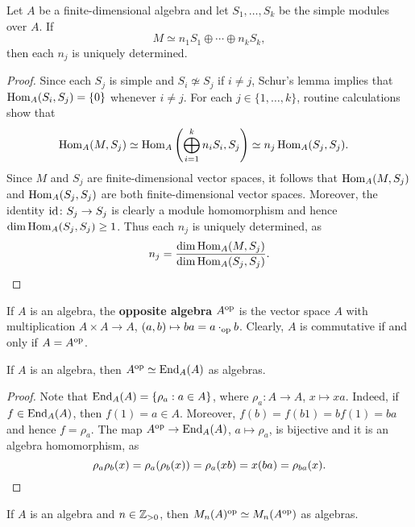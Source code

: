\begin{theorem}
Let $A$ be a finite-dimensional algebra and let 
$S_1,\dots,S_k$ be the simple modules over $A$. 
If 
\[
M\simeq n_1S_1\oplus\cdots\oplus n_kS_k,
\]
then each $n_j$ is uniquely determined.  
\end{theorem}

\begin{proof}
	Since each $S_j$ is simple and $S_i\not\simeq S_j$ if $i\ne j$, Schur's lemma implies that 
	$\operatorname{Hom}_A(S_i,S_j)=\{0\}$ whenever $i\ne j$. 
	For each $j\in\{1,\dots,k\}$, routine calculations show that 
	\begin{align*}
		\operatorname{Hom}_A(M,S_j) &\simeq \operatorname{Hom}_A\left(\bigoplus_{i=1}^k n_i S_i,S_j\right)
		\simeq n_j\operatorname{Hom}_A(S_j,S_j). 
	\end{align*} 
	Since $M$ and $S_j$ are finite-dimensional vector spaces, it follows that
	$\operatorname{Hom}_A(M,S_j)$ and $\operatorname{Hom}_A(S_j,S_j)$ 
	are both finite-dimensional vector spaces.  
	Moreover, the identity $\operatorname{id}\colon S_j\to S_j$ 
	is clearly a module homomorphism and hence  
	$\dim\operatorname{Hom}_A(S_j,S_j)\geq 1$. 
	Thus each $n_j$ is uniquely determined, as  
	\[ 
	n_j=\frac{\dim\operatorname{Hom}_A(M,S_j)}{\dim\operatorname{Hom}_A(S_j,S_j)}.\qedhere
	\]
\end{proof}

If $A$ is an algebra, the \textbf{opposite algebra} $A^{\operatorname{op}}$ is the vector space 
$A$ with multiplication $A\times A\to A$, $(a,b)\mapsto ba=a\cdot_{\operatorname{op}}b$. Clearly,
$A$ is commutative if and only if $A=A^{\operatorname{op}}$. 

\begin{lemma}
	\label{lem:A^op}
    If $A$ is an algebra, then $A^{\operatorname{op}}\simeq\operatorname{End}_A(A)$ as algebras.  
\end{lemma}

\begin{proof}
	Note that $\operatorname{End}_A(A)=\{\rho_a:a\in A\}$, where $\rho_a\colon
	A\to A$, $x\mapsto xa$. Indeed, if $f\in\operatorname{End}_A(A)$, then 
	$f(1)=a\in A$. Moreover, $f(b)=f(b1)=bf(1)=ba$ and hence 
	$f=\rho_a$. The map $A^{\operatorname{op}}\to \operatorname{End}_A(A)$, $a\mapsto\rho_a$, 
	is bijective and it is an algebra homomorphism, as 
    \[
		\rho_a\rho_b(x)=\rho_a(\rho_b(x))=\rho_a(xb)=x(ba)=\rho_{ba}(x).\qedhere
    \]
\end{proof}

\begin{lemma}
	\label{lem:Mn_op}
	If $A$ is an algebra and $n\in\mathbb{Z}_{>0}$, then $M_n(A)^{\operatorname{op}}\simeq
	M_n(A^{\operatorname{op}})$ as algebras.   
\end{lemma}

